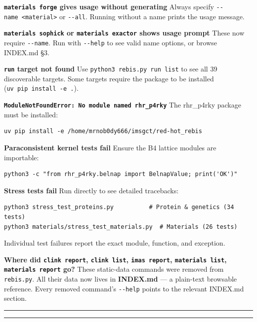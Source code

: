 \textbf{\texttt{materials\ forge} gives usage without generating} Always
specify \texttt{-\/-name\ \textless{}material\textgreater{}} or
\texttt{-\/-all}. Running without a name prints the usage message.

\textbf{\texttt{materials\ sophick} or \texttt{materials\ exactor} shows
usage prompt} These now require \texttt{-\/-name}. Run with
\texttt{-\/-help} to see valid name options, or browse INDEX.md §3.

\textbf{\texttt{run} target not found} Use
\texttt{python3\ rebis.py\ run\ list} to see all 39 discoverable
targets. Some targets require the package to be installed
(\texttt{uv\ pip\ install\ -e\ .}).

\textbf{\texttt{ModuleNotFoundError:\ No\ module\ named\ \textquotesingle{}rhr\_p4rky\textquotesingle{}}}
The rhr\_p4rky package must be installed:

\begin{verbatim}
uv pip install -e /home/mrnob0dy666/imsgct/red-hot_rebis
\end{verbatim}

\textbf{Paraconsistent kernel tests fail} Ensure the B4 lattice modules
are importable:

\begin{verbatim}
python3 -c "from rhr_p4rky.belnap import BelnapValue; print('OK')"
\end{verbatim}

\textbf{Stress tests fail} Run directly to see detailed tracebacks:

\begin{verbatim}
python3 stress_test_proteins.py          # Protein & genetics (34 tests)
python3 materials/stress_test_materials.py  # Materials (26 tests)
\end{verbatim}

Individual test failures report the exact module, function, and
exception.

\textbf{Where did \texttt{clink\ report}, \texttt{clink\ list},
\texttt{imas\ report}, \texttt{materials\ list},
\texttt{materials\ report} go?} These static-data commands were removed
from \texttt{rebis.py}. All their data now lives in \textbf{INDEX.md}
--- a plain-text browsable reference. Every removed command's
\texttt{-\/-help} points to the relevant INDEX.md section.

\begin{center}\rule{0.5\linewidth}{0.5pt}\end{center}

\begin{center}\rule{0.5\linewidth}{0.5pt}\end{center}

